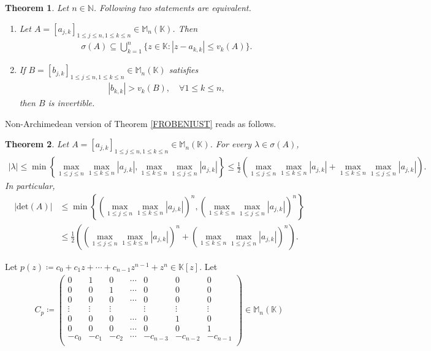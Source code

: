 \documentclass{amsart}
\newtheorem{theorem}{Theorem}[section]
\begin{document}
\begin{theorem} \cite{NICASPRAGUE}
	Let $n \in \mathbb{N}$.  Following two statements are equivalent. 
	\begin{enumerate}[\upshape(i)]
		\item Let $A=[a_{j,k}]_{1\leq j\leq n, 1\leq k \leq n}\in  \mathbb{M}_n(\mathbb{K})$. Then 
		\begin{align*}
			\sigma(A)\subseteq \bigcup_{k=1}^n\{z \in \mathbb{K}: |z-a_{k,k}|\leq v_k(A)\}.
		\end{align*}
		\item 	If  $B=[b_{j,k}]_{1\leq j\leq n, 1\leq k \leq n}\in  \mathbb{M}_n(\mathbb{K})$ satisfies
		\begin{align*}
			|b_{k,k}|>v_k(B), \quad \forall 1\leq k \leq n,
		\end{align*}
		then $B$ is invertible. 
	\end{enumerate}	
\end{theorem}
Non-Archimedean version of Theorem \ref{FROBENIUST} reads as follows. 
\begin{theorem}
Let $A=[a_{j,k}]_{1\leq j\leq n, 1\leq k \leq n} \in \mathbb{M}_n(\mathbb{K})$. For every 	$\lambda \in \sigma(A)$, 
	\begin{align*}
		|\lambda| \leq \min \left\{\max_{1\leq j \leq n}\max_{1\leq k \leq n}|a_{j,k}|, \max_{1\leq k \leq n}\max_{1\leq j \leq n}|a_{j,k}|\right\}\leq \frac{1}{2}\left(\max_{1\leq j \leq n}\max_{1\leq k \leq n}|a_{j,k}|+ \max_{1\leq k \leq n}\max_{1\leq j \leq n}|a_{j,k}|\right).
	\end{align*}
	In particular, 
	\begin{align*}
		|\text{det}(A)| &\leq  \min \left\{\left(\max_{1\leq j \leq n}\max_{1\leq k \leq n}|a_{j,k}|\right)^n, \left(\max_{1\leq k \leq n}\max_{1\leq j \leq n}|a_{j,k}|\right)^n\right\}\\
		&\leq \frac{1}{2}\left(\left(\max_{1\leq j \leq n}\max_{1\leq k \leq n}|a_{j,k}|\right)^n+ \left(\max_{1\leq k \leq n}\max_{1\leq j \leq n}|a_{j,k}|\right)^n\right).
	\end{align*}
\end{theorem}	
Let $p(z)\coloneqq c_0+c_1z+\cdots +c_{n-1}z^{n-1}+z^n \in \mathbb{K}[z]$. Let 
\begin{align*}
	C_p\coloneqq 
	\begin{pmatrix}
		0&1&0&\cdots &0 &0&0\\
		0&0&1&\cdots &0 &0&0\\
		0&0&0&\cdots &0 &0&0\\
		\vdots &\vdots &\vdots & & \vdots &\vdots &\vdots\\
		0&0&0&\cdots &0 &1&0\\
		0&0&0&\cdots &0 &0&1\\
		-c_0&-c_1&-c_2&\cdots &-c_{n-3} &-c_{n-2}&-c_{n-1}\\
	\end{pmatrix} \in \mathbb{M}_n(\mathbb{K})
\end{align*}
\end{document}
